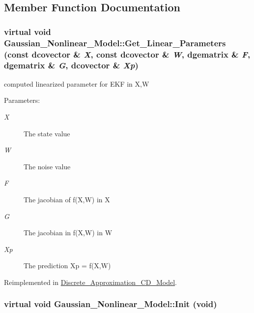 \subsection{Member Function Documentation}
\hypertarget{class_gaussian___nonlinear___model_c850a678b4672e4358d3f29d7b998549}{
\subsubsection[{Get\_\-Linear\_\-Parameters}]{\setlength{\rightskip}{0pt plus 5cm}virtual void Gaussian\_\-Nonlinear\_\-Model::Get\_\-Linear\_\-Parameters (const dcovector \& {\em X}, \/  const dcovector \& {\em W}, \/  dgematrix \& {\em F}, \/  dgematrix \& {\em G}, \/  dcovector \& {\em Xp})}}
\label{class_gaussian___nonlinear___model_c850a678b4672e4358d3f29d7b998549}


computed linearized parameter for EKF in X,W 

\begin{Desc}
\item[Parameters:]
\begin{description}
\item[{\em X}]The state value \item[{\em W}]The noise value \item[{\em F}]The jacobian of f(X,W) in X \item[{\em G}]The jacobian in f(X,W) in W \item[{\em Xp}]The prediction Xp = f(X,W) \end{description}
\end{Desc}


Reimplemented in \hyperlink{class_discrete___approximation___c_d___model_445e1215275e1f77f6260a186e9f842a}{Discrete\_\-Approximation\_\-CD\_\-Model}.\hypertarget{class_gaussian___nonlinear___model_146f819d0aeea0dc59b86e9af200e0bd}{
\subsubsection[{Init}]{\setlength{\rightskip}{0pt plus 5cm}virtual void Gaussian\_\-Nonlinear\_\-Model::Init (void)}}
\label{class_gaussian___nonlinear___model_146f819d0aeea0dc59b86e9af200e0bd}


